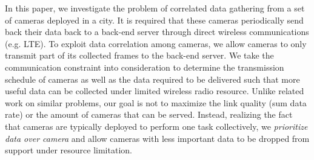 In this paper, we investigate the problem of correlated data gathering from a set of
cameras deployed in a city.
It is required that these cameras periodically send back their data back to a back-end
server through direct wireless communications (e.g. LTE).
To exploit data correlation among cameras, we allow cameras to only transmit part of
its collected frames to the back-end server.
We take the communication constraint into consideration to determine the transmission
schedule of cameras as well as the data required to be delivered such that more useful
data can be collected under limited wireless radio resource.
Unlike related work on similar problems, our goal is not to maximize the link quality
(sum data rate) or the amount of cameras that can be served.
Instead, realizing the fact that cameras are typically deployed to perform one task
collectively, we {\em prioritize data over camera} and allow cameras with less
important data to be dropped from support under resource limitation.
%

